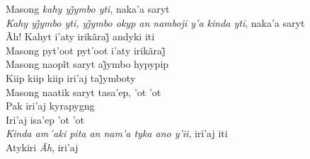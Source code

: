 \begin{linenumbers}\begingroup\raggedright
\noindent Masong \emph{kahy yj̃ymbo yti}, naka’a saryt\\
\emph{Kahy yj̃ymbo yti, yj̃ymbo okyp an namboji y’a kinda yti}, naka’a saryt\\
Ãh! Kahyt i’aty irikãraj̃ andyki iti\\
Masong pyt’oot pyt’oot i’aty irikãraj̃\\
Masong naopĩt saryt aj̃ymbo hypypip\\
Kiip kiip kiip iri’aj taj̃ymboty\\
Masong naatik saryt tasa'ep, 'ot 'ot\\
Pak iri'aj kyrapygng\\
Iri'aj isa'ep 'ot 'ot\\
\emph{Kinda am´aki pita an nam'a tyka ano y'ii}, iri'aj iti\\
Atykiri \emph{Ãh}, iri'aj

\end{linenumbers}\endgroup

\bigskip

